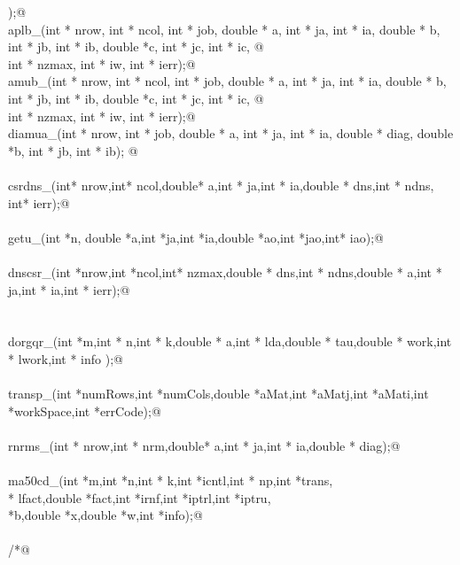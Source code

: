 \documentclass[12pt]{article}
\begin{document}
\begin{flushleft}
\begin{minipage}{\linewidth}
\begin{list}{}{}
\mbox{}\verb@                );@\\
\mbox{}\verb@int aplb_(int * nrow, int * ncol, int * job, double * a, int * ja, int * ia, double * b, int * jb, int * ib, double *c, int * jc, int * ic, @\\
\mbox{}\verb@        int * nzmax, int * iw, int * ierr);@\\
\mbox{}\verb@int amub_(int * nrow, int * ncol, int * job, double * a, int * ja, int * ia, double * b, int * jb, int * ib, double *c, int * jc, int * ic, @\\
\mbox{}\verb@        int * nzmax, int * iw, int * ierr);@\\
\mbox{}\verb@int diamua_(int * nrow,  int * job, double * a, int * ja, int * ia, double * diag, double *b, int * jb, int * ib); @\\
\mbox{}\verb@@\\
\mbox{}\verb@int csrdns_(int* nrow,int* ncol,double* a,int * ja,int * ia,double * dns,int * ndns, int* ierr);@\\
\mbox{}\verb@@\\
\mbox{}\verb@int getu_(int *n, double *a,int *ja,int *ia,double *ao,int *jao,int* iao);@\\
\mbox{}\verb@@\\
\mbox{}\verb@int dnscsr_(int *nrow,int *ncol,int* nzmax,double * dns,int * ndns,double * a,int * ja,int * ia,int * ierr);@\\
\mbox{}\verb@@\\
\mbox{}\verb@@\\
\mbox{}\verb@void dorgqr_(int *m,int * n,int * k,double * a,int * lda,double * tau,double * work,int * lwork,int * info );@\\
\mbox{}\verb@@\\
\mbox{}\verb@void transp_(int *numRows,int *numCols,double *aMat,int *aMatj,int *aMati,int *workSpace,int *errCode);@\\
\mbox{}\verb@@\\
\mbox{}\verb@int rnrms_(int * nrow,int * nrm,double* a,int * ja,int * ia,double * diag);@\\
\mbox{}\verb@@\\
\mbox{}\verb@void ma50cd_(int *m,int *n,int * k,int *icntl,int * np,int *trans,\@\\
\mbox{}\verb@int * lfact,double *fact,int *irnf,int *iptrl,int *iptru,\@\\
\mbox{}\verb@double *b,double *x,double *w,int *info);@\\
\mbox{}\verb@@\\
\mbox{}\verb@/*@\\

\end{list}
\end{minipage}
\end{flushleft}
\end{document}
